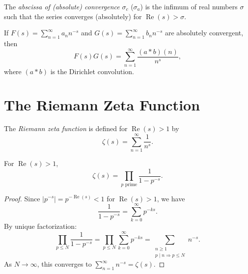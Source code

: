 \begin{definition}
  The \emph{abscissa of (absolute) convergence} $\sigma_c$ ($\sigma_a$) is the infimum of real numbers $\sigma$ such that the series converges (absolutely) for $\operatorname{Re}(s) > \sigma$.
\end{definition}

\begin{proposition}
  If $F(s) = \sum_{n=1}^{\infty} a_n n^{-s}$ and $G(s) = \sum_{n=1}^{\infty} b_n n^{-s}$ are absolutely convergent, then
  \begin{equation}
    F(s) G(s) = \sum_{n=1}^{\infty} \frac{(a * b)(n)}{n^s},
  \end{equation}
  where $(a * b)$ is the Dirichlet convolution.
\end{proposition}

\section{The Riemann Zeta Function}

\begin{definition}
  The \emph{Riemann zeta function} is defined for $\operatorname{Re}(s) > 1$ by
  \begin{equation}
    \zeta(s) = \sum_{n=1}^{\infty} \frac{1}{n^s}.
  \end{equation}
\end{definition}

\begin{theorem}
  For $\operatorname{Re}(s) > 1$,
  \begin{equation}
    \zeta(s) = \prod_{p \text{ prime}} \frac{1}{1 - p^{-s}}.
  \end{equation}
\end{theorem}

\begin{proof}
  Since $|p^{-s}| = p^{-\operatorname{Re}(s)} < 1$ for $\operatorname{Re}(s) > 1$, we have
  \begin{equation}
    \frac{1}{1 - p^{-s}} = \sum_{k=0}^{\infty} p^{-ks}.
  \end{equation}
  By unique factorization:
  \begin{equation}
    \prod_{p \leq N} \frac{1}{1 - p^{-s}} = \prod_{p \leq N} \sum_{k=0}^{\infty} p^{-ks} = \sum_{\substack{n \geq 1 \\ p \mid n \Rightarrow p \leq N}} n^{-s}.
  \end{equation}
  As $N \to \infty$, this converges to $\sum_{n=1}^{\infty} n^{-s} = \zeta(s)$.
\end{proof}

